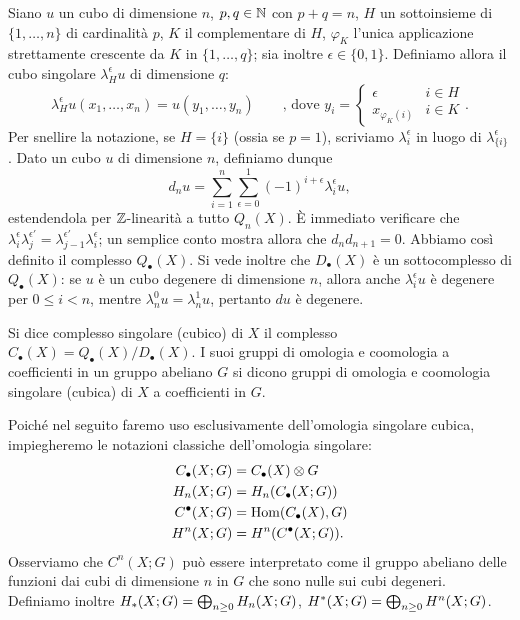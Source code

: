 Siano $u$ un cubo di dimensione $n$, $p,q\in\mathbb{N}$ con $p+q=n$, $H$ un sottoinsieme di $\{1,\ldots,n\}$ di cardinalità $p$, $K$ il complementare di $H$, $\varphi_K$ l'unica applicazione strettamente crescente da $K$ in $\{1,\ldots,q\}$; sia inoltre $\epsilon\in\{0,1\}$. Definiamo allora il cubo singolare $\lambda^\epsilon_Hu$ di dimensione $q$:
$$
\lambda^\epsilon_Hu(x_1,\ldots,x_n)=u(y_1,\ldots,y_n)\qquad\text{, dove }y_i=\begin{cases}\epsilon&i\in H\\x_{\varphi_K(i)}&i\in K\end{cases}.
$$
Per snellire la notazione, se $H=\{i\}$ (ossia se $p=1$), scriviamo $\lambda^\epsilon_i$ in luogo di $\lambda^\epsilon_{\{i\}}$. Dato un cubo $u$ di dimensione $n$, definiamo dunque
$$
d_nu=\sum_{i=1}^n\sum_{\epsilon=0}^1(-1)^{i+\epsilon}\lambda^\epsilon_iu,
$$
estendendola per $\mathbb{Z}$-linearità a tutto $Q_n(X)$. È immediato verificare che $\lambda^\epsilon_i\lambda^{\epsilon'}_j=\lambda^{\epsilon'}_{j-1}\lambda^\epsilon_i$; un semplice conto mostra allora che $d_nd_{n+1}=0$. Abbiamo così definito il complesso $Q_\bullet(X)$. Si vede inoltre che $D_\bullet(X)$ è un sottocomplesso di $Q_\bullet(X)$: se $u$ è un cubo degenere di dimensione $n$, allora anche $\lambda^\epsilon_iu$ è degenere per $0\le i<n$, mentre $\lambda^0_nu=\lambda^1_nu$, pertanto $du$ è degenere.
\begin{definition}
Si dice complesso singolare (cubico) di $X$ il complesso $C_\bullet(X)=Q_\bullet(X)/D_\bullet(X)$. I suoi gruppi di omologia e coomologia a coefficienti in un gruppo abeliano $G$ si dicono gruppi di omologia e coomologia singolare (cubica) di $X$ a coefficienti in $G$.
\end{definition}
Poiché nel seguito faremo uso esclusivamente dell'omologia singolare cubica, impiegheremo le notazioni classiche dell'omologia singolare: 
\begin{align*}
C_\bullet(X;G)&=C_\bullet(X)\mathbin{\otimes} G\\
H_n(X;G)&=H_n(C_\bullet(X;G))\\
C^\bullet(X;G)&=\operatorname{Hom}(C_\bullet(X),G)\\
H^n(X;G)&=H^n(C^\bullet(X;G)).
\end{align*}
Osserviamo che $C^n(X;G)$ può essere interpretato come il gruppo abeliano delle funzioni dai cubi di dimensione $n$ in $G$ che sono nulle sui cubi degeneri. Definiamo inoltre $H_*(X;G)=\bigoplus_{n\ge 0}H_n(X;G)$, $H^*(X;G)=\bigoplus_{n\ge 0}H^n(X;G)$.

